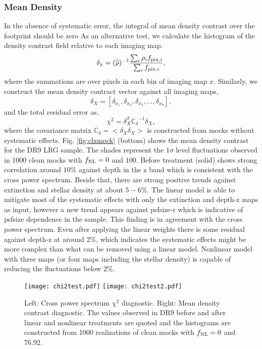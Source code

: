 \subsubsection{Mean Density}
In the absence of systematic error, the integral of mean density contrast over the footprint should be zero As an alternative test, we calculate the histogram of the density contrast field relative to each imaging map.
\begin{equation}
\delta_{x} = ({\hat{\overline{\rho}}})^{-1} \frac{\sum_{i} \rho_{i} f_{{\rm pix}, i}}{\sum_{i} f_{{\rm pix}, i}},
\end{equation}
where the summations are over pixels in each bin of imaging map $x$. Similarly, we construct the mean density contract vector against all imaging maps,
\begin{equation}
\delta_{X} = [\delta_{x_{1}}, \delta_{x_{2}}, \delta_{x_{3}}, ..., \delta_{x_{9}}],
\end{equation}
and the total residual error as,
\begin{equation}
\chi^{2} = \delta_{X}^{T} \mathbb{C_{\delta}}^{-1} \delta_{X},
\end{equation}
where the covariance matrix $\mathbb{C}_{\delta} = < \delta_{X} \delta_{X}>$ is constructed from mocks without systematic effects. Fig. \ref{fig:clxmock} (bottom) shows the mean density contrast for the DR9 LRG sample. The shades represent the $1\sigma$ level fluctuations observed in 1000 clean mocks with $f_{\rm NL}=0$ and $100$. Before treatment (solid) shows strong correlation around $10\%$ against depth in the z band which is consistent with the cross power spectrum. Beside that, there are strong positive trends against extinction and stellar density at about $5-6\%$. The linear model is able to mitigate most of the systematic effects with only the extinction and depth-z maps as input, however a new trend appears against psfsize-r which is indicative of psfsize dependence in the sample. This finding is in agreement with the cross power spectrum. Even after applying the linear weights there is some residual against depth-z at around $2\%$, which indicates the systematic effects might be more complex than what can be removed using a linear model. Nonlinear model with three maps (or four maps including the stellar density) is capable of reducing the fluctuations below $2\%$. 

\begin{figure*}
\centering
\texttt{[image: chi2test.pdf]}
\texttt{[image: chi2test2.pdf]}
\caption{Left: Cross power spectrum $\chi^{2}$ diagnostic. Right: Mean density contrast diagnostic. The values observed in DR9 before and after linear and nonlinear treatments are quoted and the histograms are constructed from 1000 realizations of clean mocks with $f_{\rm NL}=0$ and $76.92$.}\label{fig:chi2test}
\end{figure*}

